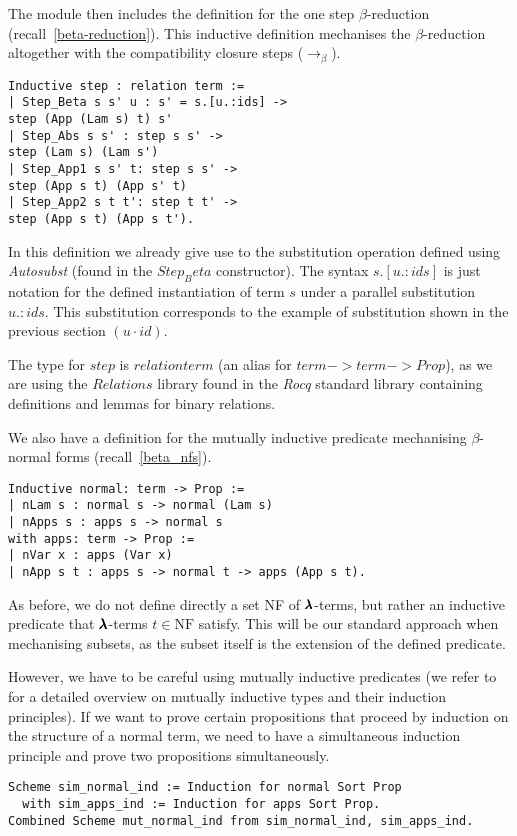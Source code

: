 The module then includes the definition for the one step $\beta$-reduction (recall~\cref{beta-reduction}).
This inductive definition mechanises the $\beta$-reduction altogether with the compatibility closure steps ($\to_\beta$).
\begin{lstlisting}[language=Coq]
Inductive step : relation term :=
| Step_Beta s s' u : s' = s.[u.:ids] ->
step (App (Lam s) t) s'
| Step_Abs s s' : step s s' ->
step (Lam s) (Lam s')
| Step_App1 s s' t: step s s' ->
step (App s t) (App s' t)
| Step_App2 s t t': step t t' ->
step (App s t) (App s t').
\end{lstlisting}

In this definition we already give use to the substitution operation defined using \textit{Autosubst} (found in the \lst$Step_Beta$ constructor).
The syntax \lst$s.[u.:ids]$ is just notation for the defined instantiation of term $s$ under a parallel substitution \lst$u.:ids$.
This substitution corresponds to the example of substitution shown in the previous section $(u \cdot id)$.

The type for \lst$step$ is \lst$relation term$ (an alias for \lst$term->term->Prop$), as we are using the \lst$Relations$ library found in the \textit{Rocq} standard library containing definitions and lemmas for binary relations.

We also have a definition for the mutually inductive predicate mechanising $\beta$-normal forms (recall~\cref{beta_nfs}).
\begin{lstlisting}[language=Coq]
Inductive normal: term -> Prop :=
| nLam s : normal s -> normal (Lam s)
| nApps s : apps s -> normal s  
with apps: term -> Prop :=
| nVar x : apps (Var x)
| nApp s t : apps s -> normal t -> apps (App s t).
\end{lstlisting}

As before, we do not define directly a set NF of $\pmb{\lambda}$-terms, but rather an inductive predicate that $\pmb{\lambda}$-terms $t \in \text{NF}$ satisfy.
This will be our standard approach when mechanising subsets, as the subset itself is the extension of the defined predicate.

However, we have to be careful using mutually inductive predicates (we refer to~\cite[Chapter~14.1]{CoqArt} for a detailed overview on mutually inductive types and their induction principles).
If we want to prove certain propositions that proceed by induction on the structure of a normal term, we need to have a simultaneous induction principle and prove two propositions simultaneously.
\begin{lstlisting}[language=Coq]
Scheme sim_normal_ind := Induction for normal Sort Prop
  with sim_apps_ind := Induction for apps Sort Prop.
Combined Scheme mut_normal_ind from sim_normal_ind, sim_apps_ind.
\end{lstlisting}

